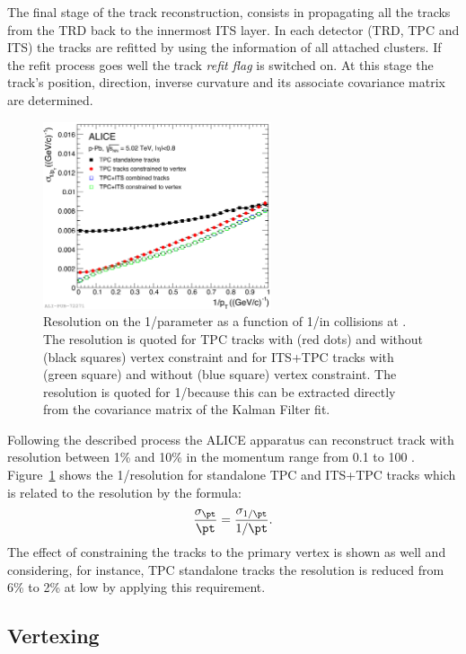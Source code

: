 The final stage of the track reconstruction, consists in propagating all the tracks from the TRD
back to the innermost ITS layer. 
In each detector (TRD, TPC and ITS) the tracks are refitted by using the information of all attached
clusters.
If the refit process goes well the track \textit{refit flag} is switched on.
At this stage the track’s position, direction, inverse curvature and its associate covariance 
matrix are determined.

\begin{figure}
    \centering
    \includegraphics[width=0.6\textwidth]{gfx/ptresolution}
	\caption{Resolution on the 1/\pt parameter as a function of 1/\pt in \pPb collisions at \sctev. The resolution is quoted for TPC tracks with (red dots) and without (black squares) vertex constraint and for ITS+TPC tracks with (green square) and without (blue square) vertex constraint. The resolution is quoted for 1/\pt because this can be extracted directly from the covariance matrix of the Kalman Filter fit.}
	\label{fig:vertres}
\end{figure}

Following the described process the ALICE apparatus can reconstruct track with resolution
between 1\% and 10\% in the momentum range from 0.1 to 100 \gevc. 
Figure~\ref{fig:vertres} shows the 1/\pt resolution for standalone TPC and ITS+TPC tracks which
is related to the \pt resolution by the formula:
\begin{equation}
    \frac{\sigma_{\pt}}{\pt} = \frac{\sigma_{1/\pt}}{1/\pt}.
\end{equation}
The effect of constraining the tracks to the primary vertex is shown as well and considering,
for instance, TPC standalone tracks the resolution is reduced from 6\% to 2\% at low \pt by applying
this requirement.

%
\subsection{Vertexing} \label{sec:vertexing}

